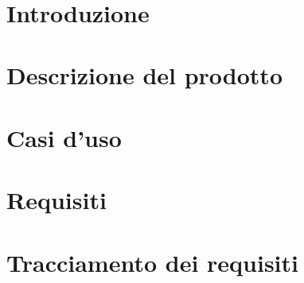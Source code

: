 \documentclass[12pt, a4paper,table]{article}
\title{\textsc{\docNome}}
\author{}
\date{}
\begin{document}


\tableofcontents
\newpage
\section{Introduzione}

\newpage
\section{Descrizione del prodotto}

\newpage
\section{Casi d'uso}

\newpage
\section{Requisiti}

\newpage
\section{Tracciamento dei requisiti}

\newpage
\end{document}
